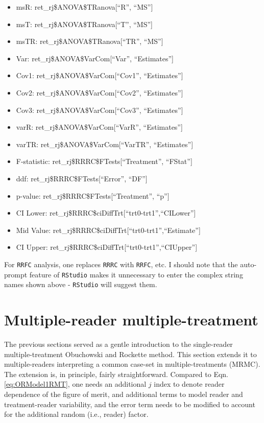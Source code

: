 \documentclass[
]{book}
\providecommand{\tightlist}{%
  \setlength{\itemsep}{0pt}\setlength{\parskip}{0pt}}
\begin{document}
\begin{itemize}
\tightlist
\item
  msR: ret\_rj\$ANOVA\$TRanova{[}``R'', ``MS''{]}
\item
  msT: ret\_rj\$ANOVA\$TRanova{[}``T'', ``MS''{]}
\item
  msTR: ret\_rj\$ANOVA\$TRanova{[}``TR'', ``MS''{]}
\item
  Var: ret\_rj\$ANOVA\$VarCom{[}``Var'', ``Estimates''{]}
\item
  Cov1: ret\_rj\$ANOVA\$VarCom{[}``Cov1'', ``Estimates''{]}
\item
  Cov2: ret\_rj\$ANOVA\$VarCom{[}``Cov2'', ``Estimates''{]}
\item
  Cov3: ret\_rj\$ANOVA\$VarCom{[}``Cov3'', ``Estimates''{]}
\item
  varR: ret\_rj\$ANOVA\$VarCom{[}``VarR'', ``Estimates''{]}
\item
  varTR: ret\_rj\$ANOVA\$VarCom{[}``VarTR'', ``Estimates''{]}
\item
  F-statistic: ret\_rj\$RRRC\$FTests{[}``Treatment'', ``FStat''{]}
\item
  ddf: ret\_rj\$RRRC\$FTests{[}``Error'', ``DF''{]}
\item
  p-value: ret\_rj\$RRRC\$FTests{[}``Treatment'', ``p''{]}
\item
  CI Lower: ret\_rj\$RRRC\$ciDiffTrt{[}``trt0-trt1'',``CILower''{]}
\item
  Mid Value: ret\_rj\$RRRC\$ciDiffTrt{[}``trt0-trt1'',``Estimate''{]}
\item
  CI Upper: ret\_rj\$RRRC\$ciDiffTrt{[}``trt0-trt1'',``CIUpper''{]}
\end{itemize}

For \texttt{RRFC} analysis, one replaces \texttt{RRRC} with \texttt{RRFC}, etc. I should note that the auto-prompt feature of \texttt{RStudio} makes it unnecessary to enter the complex string names shown above - \texttt{RStudio} will suggest them.

\hypertarget{SignificanceTestingORMRMC}{%
\section{Multiple-reader multiple-treatment}\label{SignificanceTestingORMRMC}}

The previous sections served as a gentle introduction to the single-reader multiple-treatment Obuchowski and Rockette method. This section extends it to multiple-readers interpreting a common case-set in multiple-treatments (MRMC). The extension is, in principle, fairly straightforward. Compared to Eqn. \eqref{eq:ORModel1RMT}, one needs an additional \(j\) index to denote reader dependence of the figure of merit, and additional terms to model reader and treatment-reader variability, and the error term needs to be modified to account for the additional random (i.e., reader) factor.
\end{document}
